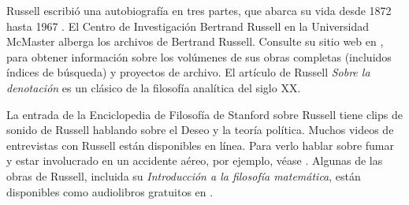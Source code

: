 \documentclass[../../../include/open-logic-section]{subfiles}
\begin{document}
\begin{reading}
Russell escribió una autobiografía en tres partes, que abarca su vida desde 1872 hasta 1967 \citep{Russell1967,Russell1968,Russell1969}. El Centro de Investigación Bertrand Russell en la Universidad McMaster alberga los archivos de Bertrand Russell. Consulte su sitio web en \citet{Duncan2015}, para obtener información sobre los volúmenes de sus obras completas (incluidos índices de búsqueda) y proyectos de archivo. El artículo de Russell \emph{Sobre la denotación} \citep{Russell1905} es un clásico de la filosofía analítica del siglo XX.

La entrada de la Enciclopedia de Filosofía de Stanford sobre Russell \citep{Irvine2015} tiene clips de sonido de Russell hablando sobre el Deseo y la teoría política. Muchos videos de entrevistas con Russell están disponibles en línea. Para verlo hablar sobre fumar y estar involucrado en un accidente aéreo, por ejemplo, véase \citet{RussellND}. Algunas de las obras de Russell, incluida su \emph{Introducción a la filosofía matemática}, están disponibles como audiolibros gratuitos en \citet{LibriVoxND}.
\end{reading}
\end{document}
